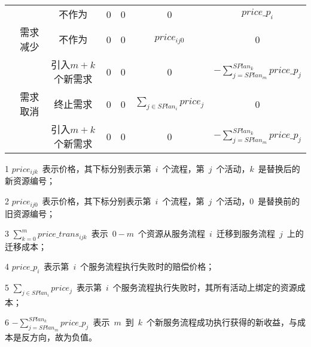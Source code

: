 \begin{table}[htbp]
\begin{threeparttable}
\begin{tabular}{lllllll}
            & \multicolumn{1}{c}{} 
            & \multicolumn{1}{c}{不作为} 
            & \multicolumn{1}{c}{0} 
            & \multicolumn{1}{c}{0} 
            & \multicolumn{1}{c}{0} 
            & \multicolumn{1}{c}{$price\_p_i$} \\
            
            & \multicolumn{1}{c}{需求减少} 
            & \multicolumn{1}{c}{不作为} 
            & \multicolumn{1}{c}{0} 
            & \multicolumn{1}{c}{0} 
            & \multicolumn{1}{c}{$price_{ij0}$} 
            & \multicolumn{1}{c}{0} \\
            
            & \multicolumn{1}{c}{} 
            & \multicolumn{1}{c}{引入$m+k$个新需求} 
            & \multicolumn{1}{c}{0} 
            & \multicolumn{1}{c}{0} 
            & \multicolumn{1}{c}{0} 
            & \multicolumn{1}{c}{$-\sum\limits_{j = SPla{n_m}}^{SPla{n_k}} {price\_{p_j}}$} \\
            
            & \multicolumn{1}{c}{需求取消} 
            & \multicolumn{1}{c}{终止需求} 
            & \multicolumn{1}{c}{0} 
            & \multicolumn{1}{c}{0} 
            & \multicolumn{1}{c}{$\sum\limits_{j \in SPla{n_i}} {pric{e_j}}$} 
            & \multicolumn{1}{c}{0} \\
            
            & \multicolumn{1}{c}{} 
            & \multicolumn{1}{c}{引入$m+k$个新需求} 
            & \multicolumn{1}{c}{0} 
            & \multicolumn{1}{c}{0} 
            & \multicolumn{1}{c}{0} 
            & \multicolumn{1}{c}{$-\sum\limits_{j = SPla{n_m}}^{SPla{n_k}} {price\_{p_j}}$\tnote{6}} \\
            
            \bottomrule
            
        \end{tabular}%
        \begin{tablenotes}
            \item[1] $price_{ijk}$~表示价格，其下标分别表示第~$i$~个流程，第~$j$~个活动，$k$~是替换后的新资源编号；
            \item[2] $price_{ij0}$~表示价格，其下标分别表示第~$i$~个流程，第~$j$~个活动，$0$~是替换前的旧资源编号；
            \item[3] $\sum\limits_{k = 0}^m {price\_tran{s_{ijk}}}$~表示~$0-m$~个资源从服务流程~$i$~迁移到服务流程~$j$~上的迁移成本；
            \item[4] $price\_p_i$~表示第~$i$~个服务流程执行失败时的赔偿价格；
            \item[5] $\sum\limits_{j \in SPla{n_i}} {pric{e_j}}$~表示第~$i$~个服务流程执行失败时，其所有活动上绑定的资源成本；
            \item[6] $-\sum\limits_{j = SPla{n_m}}^{SPla{n_k}} {price\_{p_j}}$~表示~$m$~到~$k$~个新服务流程成功执行获得的新收益，与成本是反方向，故为负值。
        \end{tablenotes}
    \end{threeparttable}
\end{table}%

